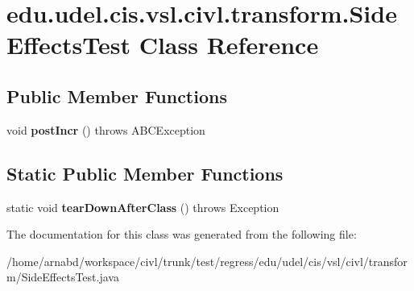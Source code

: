 \hypertarget{classedu_1_1udel_1_1cis_1_1vsl_1_1civl_1_1transform_1_1SideEffectsTest}{}\section{edu.\+udel.\+cis.\+vsl.\+civl.\+transform.\+Side\+Effects\+Test Class Reference}
\label{classedu_1_1udel_1_1cis_1_1vsl_1_1civl_1_1transform_1_1SideEffectsTest}
\subsection*{Public Member Functions}
\begin{DoxyCompactItemize}
\item 
\hypertarget{classedu_1_1udel_1_1cis_1_1vsl_1_1civl_1_1transform_1_1SideEffectsTest_a2075b8acb624eda05aed70793b0d6168}{}void {\bfseries post\+Incr} ()  throws A\+B\+C\+Exception \label{classedu_1_1udel_1_1cis_1_1vsl_1_1civl_1_1transform_1_1SideEffectsTest_a2075b8acb624eda05aed70793b0d6168}

\end{DoxyCompactItemize}
\subsection*{Static Public Member Functions}
\begin{DoxyCompactItemize}
\item 
\hypertarget{classedu_1_1udel_1_1cis_1_1vsl_1_1civl_1_1transform_1_1SideEffectsTest_aadfe43cb3b807f3621bdb3ed61ac5079}{}static void {\bfseries tear\+Down\+After\+Class} ()  throws Exception \label{classedu_1_1udel_1_1cis_1_1vsl_1_1civl_1_1transform_1_1SideEffectsTest_aadfe43cb3b807f3621bdb3ed61ac5079}

\end{DoxyCompactItemize}


The documentation for this class was generated from the following file\+:\begin{DoxyCompactItemize}
\item 
/home/arnabd/workspace/civl/trunk/test/regress/edu/udel/cis/vsl/civl/transform/Side\+Effects\+Test.\+java\end{DoxyCompactItemize}

